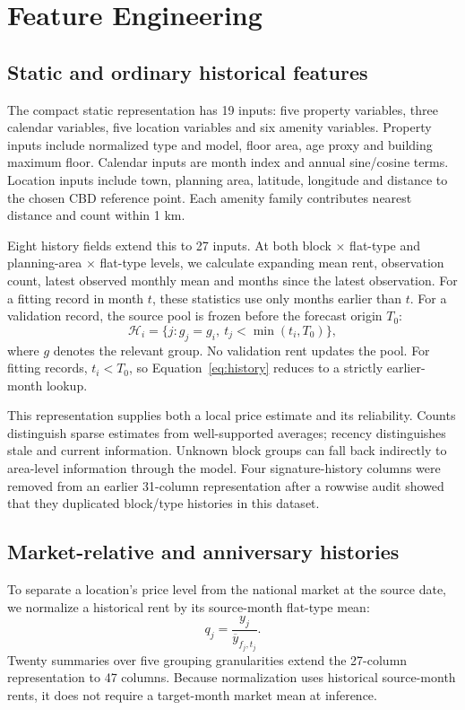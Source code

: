 \documentclass[conference]{IEEEtran}
\begin{document}
\section{Feature Engineering}
\subsection{Static and ordinary historical features}
The compact static representation has 19 inputs: five property variables, three calendar variables, five location variables and six amenity variables. Property inputs include normalized type and model, floor area, age proxy and building maximum floor. Calendar inputs are month index and annual sine/cosine terms. Location inputs include town, planning area, latitude, longitude and distance to the chosen CBD reference point. Each amenity family contributes nearest distance and count within 1 km.

Eight history fields extend this to 27 inputs. At both block $\times$ flat-type and planning-area $\times$ flat-type levels, we calculate expanding mean rent, observation count, latest observed monthly mean and months since the latest observation. For a fitting record in month $t$, these statistics use only months earlier than $t$. For a validation record, the source pool is frozen before the forecast origin $T_0$:
\begin{equation}
\mathcal{H}_i=\{j:g_j=g_i,\ t_j<\min(t_i,T_0)\},
\label{eq:history}
\end{equation}
where $g$ denotes the relevant group. No validation rent updates the pool. For fitting records, $t_i<T_0$, so Equation~\ref{eq:history} reduces to a strictly earlier-month lookup.

This representation supplies both a local price estimate and its reliability. Counts distinguish sparse estimates from well-supported averages; recency distinguishes stale and current information. Unknown block groups can fall back indirectly to area-level information through the model. Four signature-history columns were removed from an earlier 31-column representation after a rowwise audit showed that they duplicated block/type histories in this dataset.

\subsection{Market-relative and anniversary histories}
To separate a location's price level from the national market at the source date, we normalize a historical rent by its source-month flat-type mean:
\begin{equation}
q_j=\frac{y_j}{\overline y_{f_j,t_j}}.
\end{equation}
Twenty summaries over five grouping granularities extend the 27-column representation to 47 columns. Because normalization uses historical source-month rents, it does not require a target-month market mean at inference.
\end{document}
